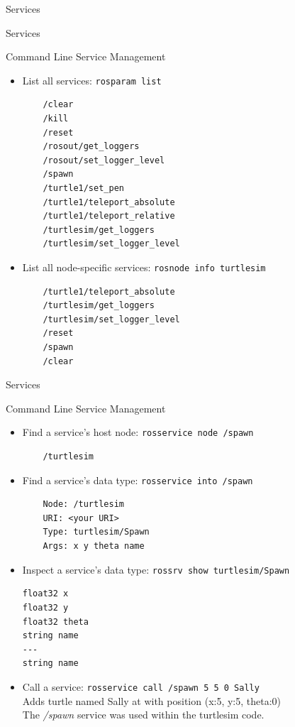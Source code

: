 \documentclass[9pt]{beamer}
\begin{document}
\begin{section}{Services}
    \begin{frame}[fragile]{Services}
        \begin{block}{Command Line Service Management}
            \begin{itemize}
                \item[] List all services: \lstinline{rosparam list}
                    \begin{lstlisting}
    /clear
    /kill
    /reset
    /rosout/get_loggers
    /rosout/set_logger_level
    /spawn
    /turtle1/set_pen
    /turtle1/teleport_absolute
    /turtle1/teleport_relative
    /turtlesim/get_loggers
    /turtlesim/set_logger_level
                    \end{lstlisting}
                \item[] List all node-specific services: \lstinline{rosnode info turtlesim}
                    \begin{lstlisting}
    /turtle1/teleport_absolute
    /turtlesim/get_loggers
    /turtlesim/set_logger_level
    /reset
    /spawn
    /clear
                    \end{lstlisting}                
                \end{itemize}
            \end{block}
    \end{frame}
    \begin{frame}[fragile]{Services}
        \begin{block}{Command Line Service Management}   
                \begin{itemize}
                    \item[] Find a service's host node: \lstinline{rosservice node /spawn}
                    \begin{lstlisting}
    /turtlesim
                    \end{lstlisting}
                \item[] Find a service's data type: \lstinline{rosservice into /spawn} \\
                    \begin{lstlisting}
    Node: /turtlesim
    URI: <your URI>
    Type: turtlesim/Spawn
    Args: x y theta name
                    \end{lstlisting}
                \item[] Inspect a service's data type: \lstinline{rossrv show turtlesim/Spawn}
                    \begin{lstlisting}
float32 x
float32 y
float32 theta
string name
---
string name
                    \end{lstlisting}
                \item[] Call a service: \lstinline{rosservice call /spawn 5 5 0 Sally} \\
                Adds turtle named Sally at with position (x:5, y:5, theta:0) \\
                The \textit{/spawn} service was used within the turtlesim code.
            \end{itemize}
        \end{block}     
    \end{frame}
\end{section}
\end{document}
